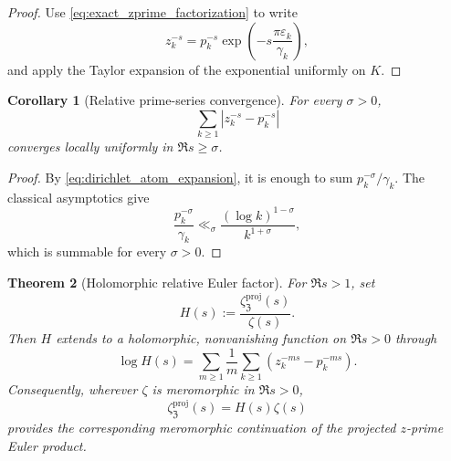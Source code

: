 \documentclass[11pt]{amsart}
\numberwithin{equation}{section}
\theoremstyle{plain}
\newtheorem{theorem}{Theorem}[section]
\newtheorem{corollary}[theorem]{Corollary}
\theoremstyle{definition}
\theoremstyle{remark}
\newcommand{\ZP}{\mathfrak Z}
\begin{document}
\begin{proof}
Use \eqref{eq:exact_zprime_factorization} to write
\begin{equation}
 z_k^{-s}
 =p_k^{-s}\exp\left(-s\frac{\pi\varepsilon_k}{\gamma_k}\right),
 \label{eq:dirichlet_atom_factorization}
\end{equation}
and apply the Taylor expansion of the exponential uniformly on $K$.
\end{proof}

\begin{corollary}[Relative prime-series convergence]
\label{cor:relative_prime_series_convergence}
For every $\sigma>0$,
\begin{equation}
 \sum_{k\geq1}|z_k^{-s}-p_k^{-s}|
 \label{eq:relative_prime_series}
\end{equation}
converges locally uniformly in $\Re s\geq\sigma$.
\end{corollary}

\begin{proof}
By \eqref{eq:dirichlet_atom_expansion}, it is enough to sum
$p_k^{-\sigma}/\gamma_k$.  The classical asymptotics give
\begin{equation}
 \frac{p_k^{-\sigma}}{\gamma_k}
 \ll_\sigma
 \frac{(\log k)^{1-\sigma}}{k^{1+\sigma}},
 \label{eq:relative_series_majorant}
\end{equation}
which is summable for every $\sigma>0$.
\end{proof}

\begin{theorem}[Holomorphic relative Euler factor]
\label{thm:holomorphic_relative_euler_factor}
For $\Re s>1$, set
\begin{equation}
 H(s):=\frac{\zeta_{\ZP}^{\mathrm{proj}}(s)}{\zeta(s)}.
 \label{eq:relative_euler_factor_definition}
\end{equation}
Then $H$ extends to a holomorphic, nonvanishing function on
$\Re s>0$ through
\begin{equation}
 \log H(s)
 =\sum_{m\geq1}\frac1m
 \sum_{k\geq1}\left(z_k^{-ms}-p_k^{-ms}\right).
 \label{eq:relative_logarithm_series}
\end{equation}
Consequently, wherever $\zeta$ is meromorphic in $\Re s>0$,
\begin{equation}
 \zeta_{\ZP}^{\mathrm{proj}}(s)=H(s)\zeta(s)
 \label{eq:relative_factorization}
\end{equation}
provides the corresponding meromorphic continuation of the projected
$z$-prime Euler product.
\end{theorem}
\end{document}
